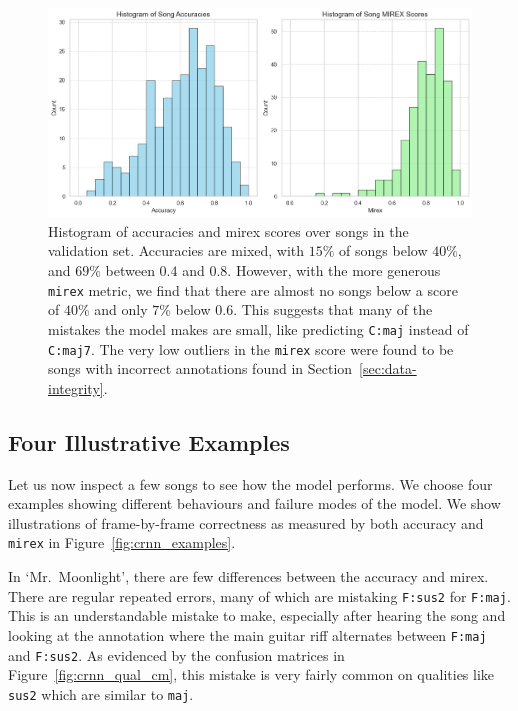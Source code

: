 \begin{figure}[H]
    \centering
    \includegraphics[width=1.0\textwidth]{figures/accuracy_mirex_histograms.png}
    \caption{Histogram of accuracies and mirex scores over songs in the validation set. Accuracies are mixed, with $15\%$ of songs below $40\%$, and $69\%$ between $0.4$ and $0.8$. However, with the more generous \texttt{mirex} metric, we find that there are almost no songs below a score of $40\%$ and only $7\%$ below $0.6$. This suggests that many of the mistakes the model makes are small, like predicting \texttt{C:maj} instead of \texttt{C:maj7}. The very low outliers in the \texttt{mirex} score were found to be songs with incorrect annotations found in Section~\ref{sec:data-integrity}.}\label{fig:crnn_song_hist}
\end{figure}

\subsection{Four Illustrative Examples}\label{sec:crnn_examples}

Let us now inspect a few songs to see how the model performs. We choose four examples showing different behaviours and failure modes of the model. We show illustrations of frame-by-frame correctness as measured by both accuracy and \texttt{mirex} in Figure~\ref{fig:crnn_examples}. 

In `Mr.\ Moonlight', there are few differences between the accuracy and mirex. There are regular repeated errors, many of which are mistaking \texttt{F:sus2} for \texttt{F:maj}. This is an understandable mistake to make, especially after hearing the song and looking at the annotation where the main guitar riff alternates between \texttt{F:maj} and \texttt{F:sus2}. As evidenced by the confusion matrices in Figure~\ref{fig:crnn_qual_cm}, this mistake is very fairly common on qualities like \texttt{sus2} which are similar to \texttt{maj}. 

